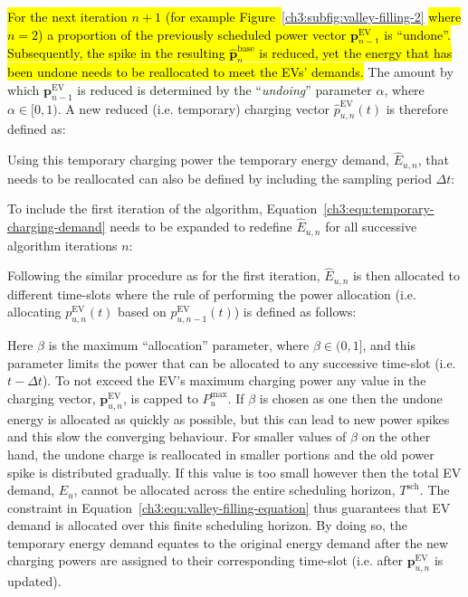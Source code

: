 \hl{For the next iteration $n+1$ (for example Figure~}\ref{ch3:subfig:valley-filling-2}\hl{ where $n=2$) a proportion of the previously scheduled power vector $\textbf{p}^\text{EV}_{n-1}$ is ``undone''.
Subsequently, the spike in the resulting $\hat{\textbf{p}}^\text{base}_{n}$ is reduced, yet the energy that has been undone needs to be reallocated to meet the EVs' demands.}
The amount by which $\textbf{p}^\text{EV}_{n-1}$ is reduced is determined by the ``\textit{undoing}'' parameter $\alpha$, where $\alpha \in [0, 1)$.
A new reduced (i.e. temporary) charging vector $\hat{p}^\text{EV}_{u, n}(t)$ is therefore defined as:



Using this temporary charging power the temporary energy demand, $\hat{E}_{u,n}$, that needs to be reallocated can also be defined by including the sampling period $\Delta t$:



To include the first iteration of the algorithm, Equation~\ref{ch3:equ:temporary-charging-demand} needs to be expanded to redefine $\hat{E}_{u,n}$ for all successive algorithm iterations $n$:



Following the similar procedure as for the first iteration, $\hat{E}_{u,n}$ is then allocated to different time-slots where the rule of performing the power allocation (i.e. allocating $p^\text{EV}_{u,n}(t)$ based on $p^\text{EV}_{u,n-1}(t)$) is defined as follows:



\nomenclature[K]{$\alpha$}{Undoing parameter to remove a portion of the temporary energy demand, $\hat{E}_{u,n}$, where $\alpha \in (0, 1]$}
\nomenclature[K]{$\beta$}{Allocation parameter to assign a portion of the temporary energy demand, $\hat{E}_{u,n}$, where $\beta \in (0, 1]$}

Here $\beta$ is the maximum ``allocation'' parameter, where $\beta \in (0, 1]$, and this parameter limits the power that can be allocated to any successive time-slot (i.e. $t-\Delta t$).
To not exceed the EV's maximum charging power any value in the charging vector, $\textbf{p}^\text{EV}_{u,n}$, is capped to $P^\text{max}_{u}$.
If $\beta$ is chosen as one then the undone energy is allocated as quickly as possible, but this can lead to new power spikes and this slow the converging behaviour.
For smaller values of $\beta$ on the other hand, the undone charge is reallocated in smaller portions and the old power spike is distributed gradually.
If this value is too small however then the total EV demand, $E_u$, cannot be allocated across the entire scheduling horizon, $T^\text{sch}$.
The constraint in Equation~\ref{ch3:equ:valley-filling-equation} thus guarantees that EV demand is allocated over this finite scheduling horizon.
By doing so, the temporary energy demand equates to the original energy demand after the new charging powers are assigned to their corresponding time-slot (i.e. after $\textbf{p}^\text{EV}_{u,n}$ is updated).

